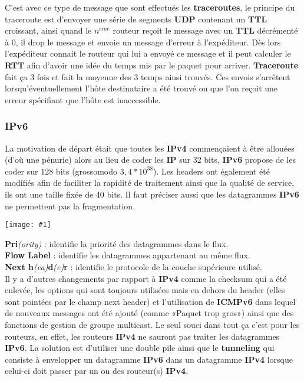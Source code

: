\documentclass{article}
\newcommand{\imgR}[2]{\begin{center}\texttt{[image: \#1]}\end{center}}
\begin{document}
C'est avec ce type de message que sont effectués les \textbf{traceroutes}, le principe du traceroute est 
d'envoyer une série de segments \textbf{UDP} contenant un \textbf{TTL} croissant, ainsi quand le $n^{eme}$ 
routeur reçoit le message avec un \textbf{TTL} décrémenté à 0, il drop le message et envoie un message d'erreur
à l'expéditeur. Dès lors l'expéditeur connait le routeur qui lui a envoyé ce message et il peut calculer le 
\textbf{RTT} afin d'avoir une idée du temps mis par le paquet pour arriver. \textbf{Traceroute} fait ça 3 fois et 
fait la moyenne des 3 temps ainsi trouvés. Ces envois s'arrêtent lorsqu'éventuellement l'hôte destinataire a été 
trouvé ou que l'on reçoit une erreur spécifiant que l'hôte est inaccessible.

\subsubsection{IPv6}

La motivation de départ était que toutes les \textbf{IPv4} commençaient à être allouées (d'où une pénurie) alors
au lieu de coder les \textbf{IP} sur 32 bits, \textbf{IPv6} propose de les coder sur 128 bits (grossomodo 
$3,4*10^{38}$). Les headers ont également été modifiés afin de faciliter la rapidité de traitement ainsi que la
qualité de service, ils ont une taille fixée de 40 bits. Il faut préciser aussi que les datagrammes \textbf{IPv6}
ne permettent pas la fragmentation.

\imgR{CN_083.png}{200}

\noindent \textbf{Pri}\textit{(ority)} : identifie la priorité des datagrammes dans le flux. \\
\textbf{Flow Label} : identifie les datagrammes appartenant au même flux.\\
\textbf{Next h}\textit{(ea)}\textbf{d}\textit{(e)}\textbf{r} : identifie le protocole de la couche supérieure
utilisé. \\
Il y a d'autres changements par rapport à \textbf{IPv4} comme la checksum qui a été enlevée, les options qui sont
toujours utilisées mais en dehors du header (elles sont pointées par le champ next header) et l'utilisation de
\textbf{ICMPv6} dans lequel de nouveaux messages ont été ajouté (comme «Paquet trop gros») ainsi que des 
fonctions de gestion de groupe multicast. Le seul souci dans tout ça c'est pour les routeurs, en effet, les 
routeurs \textbf{IPv4} ne sauront pas traiter les datagrammes \textbf{IPv6}. La solution est d'utiliser une 
double pile ainsi que le \textbf{tunneling} qui consiste à envelopper un datagramme \textbf{IPv6} dans un 
datagramme \textbf{IPv4} lorsque celui-ci doit passer par un ou des routeur(s) \textbf{IPv4}.
\end{document}
